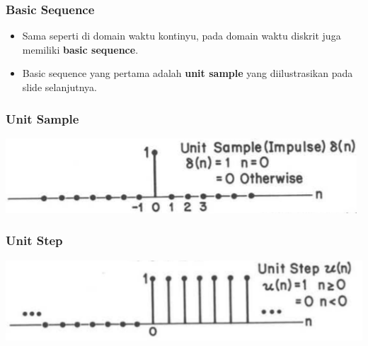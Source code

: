 \documentclass[pdflatex,compress]{beamer}
\begin{document}
\begin{frame}
	\frametitle{Basic Sequence}
	\begin{itemize}
		\item Sama seperti di domain waktu kontinyu, pada domain waktu diskrit juga memiliki \textbf{basic sequence}.
		\item Basic sequence yang pertama adalah \textbf{unit sample} yang diilustrasikan pada slide selanjutnya.
	\end{itemize}
\end{frame}

\begin{frame}
	\frametitle{Unit Sample}
	\begin{center}
		\includegraphics[width=\linewidth]{img/img002}
	\end{center}
\end{frame}

\begin{frame}
	\frametitle{Unit Step}
	\begin{center}
		\includegraphics[width=\linewidth]{img/img003}
	\end{center}
\end{frame}
\end{document}
